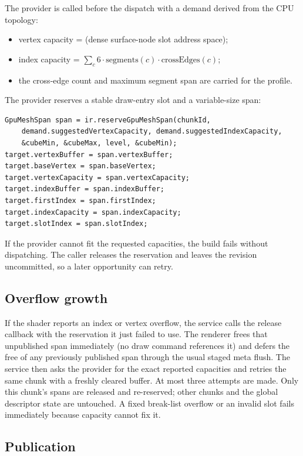 The provider is called before the dispatch with a demand derived from the
CPU topology:
\begin{itemize}
\item vertex capacity =  (dense surface-node slot
  address space);
\item index capacity = $\sum_c 6\cdot\text{segments}(c)\cdot
  \text{crossEdges}(c)$;
\item the cross-edge count and maximum segment span are carried for the
  profile.
\end{itemize}
The provider reserves a stable draw-entry slot and a variable-size span:
\begin{lstlisting}[caption={Span reservation callback (shape).},label={lst:provider}]
GpuMeshSpan span = ir.reserveGpuMeshSpan(chunkId,
    demand.suggestedVertexCapacity, demand.suggestedIndexCapacity,
    &cubeMin, &cubeMax, level, &cubeMin);
target.vertexBuffer = span.vertexBuffer;
target.baseVertex = span.baseVertex;
target.vertexCapacity = span.vertexCapacity;
target.indexBuffer = span.indexBuffer;
target.firstIndex = span.firstIndex;
target.indexCapacity = span.indexCapacity;
target.slotIndex = span.slotIndex;
\end{lstlisting}
If the provider cannot fit the requested capacities, the build fails
without dispatching.  The caller releases the reservation and leaves the
revision uncommitted, so a later opportunity can retry.

\subsection{Overflow growth}

If the shader reports an index or vertex overflow, the service calls the
release callback with the reservation it just failed to use.  The renderer
frees that unpublished span immediately (no draw command references it) and
defers the free of any previously published span through the usual staged
meta flush.  The service then asks the provider for the exact reported
capacities and retries the same chunk with a freshly cleared
 buffer.  At most three attempts are made.  Only this
chunk's spans are released and re-reserved; other chunks and the global
descriptor state are untouched.  A fixed break-list overflow or an invalid
slot fails immediately because capacity cannot fix it.

\subsection{Publication}

